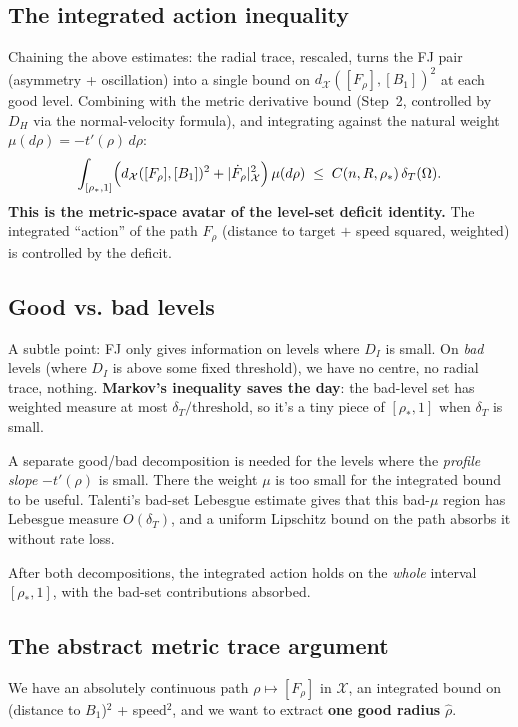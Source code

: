 \documentclass[11pt,a4paper]{article}
\newcommand{\X}{\mathcal{X}}
\newcommand{\Frho}{F_\rho}
\newcommand{\rhad}{\widehat{\rho}}
\newcommand{\rstar}{\rho_*}
\newcommand{\deltaT}{\delta_T}
\newcommand{\dX}{d_{\X}}
\begin{document}
\subsection*{The integrated action inequality}

Chaining the above estimates: the radial trace, rescaled, turns the FJ pair (asymmetry + oscillation) into a single bound on $\dX([\Frho], [B_1])^2$ at each good level. Combining with the metric derivative bound (Step~2, controlled by $D_H$ via the normal-velocity formula), and integrating against the natural weight $\mu(d\rho) = -t'(\rho)\, d\rho$:
\[
\int_{[\rstar, 1]} \Bigl( \dX([\Frho], [B_1])^2 + |\dot \Frho|_{\X}^2 \Bigr)\, \mu(d\rho)
\;\le\; C(n, R, \rstar)\, \deltaT(\Omega).
\]
\textbf{This is the metric-space avatar of the level-set deficit identity.} The integrated ``action'' of the path $\Frho$ (distance to target $+$ speed squared, weighted) is controlled by the deficit.

\subsection*{Good vs. bad levels}

A subtle point: FJ only gives information on levels where $D_I$ is small. On \emph{bad} levels (where $D_I$ is above some fixed threshold), we have no centre, no radial trace, nothing. \textbf{Markov's inequality saves the day}: the bad-level set has weighted measure at most $\deltaT/\text{threshold}$, so it's a tiny piece of $[\rstar, 1]$ when $\deltaT$ is small.

A separate good/bad decomposition is needed for the levels where the \emph{profile slope} $-t'(\rho)$ is small. There the weight $\mu$ is too small for the integrated bound to be useful. Talenti's bad-set Lebesgue estimate gives that this bad-$\mu$ region has Lebesgue measure $O(\deltaT)$, and a uniform Lipschitz bound on the path absorbs it without rate loss.

After both decompositions, the integrated action holds on the \emph{whole} interval $[\rstar, 1]$, with the bad-set contributions absorbed.

\subsection*{The abstract metric trace argument}

We have an absolutely continuous path $\rho \mapsto [\Frho]$ in $\X$, an integrated bound on (distance to $B_1$)$^2$ + speed$^2$, and we want to extract \textbf{one good radius} $\rhad$.
\end{document}
